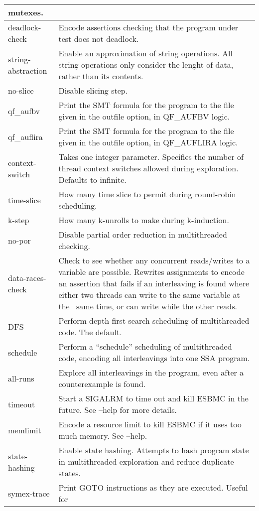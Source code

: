 \documentclass{article}
\begin{document}
\begin{table*}[ht]
\begin{tabularx}{\linewidth}{|l|X|}
mutexes.\\
\hline
deadlock-check & Encode assertions checking that the program under test does not
deadlock.\\
\hline
string-abstraction & Enable an approximation of string operations. All string
operations only consider the lenght of data, rather than its contents.\\
\hline
no-slice & Disable slicing step.\\
\hline
qf\_aufbv & Print the SMT formula for the program to the file given in the
outfile option, in QF\_AUFBV logic.\\
\hline
qf\_auflira & Print the SMT formula for the program to the file given in the
outfile option, in QF\_AUFLIRA logic.\\
\hline
context-switch & Takes one integer parameter. Specifies the number of thread
context switches allowed during exploration. Defaults to infinite.\\
\hline
time-slice & How many time slice to permit during round-robin scheduling.\\
\hline
k-step & How many k-unrolls to make during k-induction.\\
\hline
no-por & Disable partial order reduction in multithreaded checking.\\
\hline
data-races-check & Check to see whether any concurrent reads/writes to a
variable are possible. Rewrites assignments to encode an assertion that fails
if an interleaving is found where either two threads can write to the same
variable at the ~same time, or can write while the other reads.\\
\hline
DFS & Perform depth first search scheduling of multithreaded code. The
default.\\
\hline
schedule & Perform a ``schedule'' scheduling of multithreaded code, encoding
all interleavings into one SSA program.\\
\hline
all-runs & Explore all interleavings in the program, even after a counterexample
is found.\\
\hline
timeout & Start a SIGALRM to time out and kill ESBMC in the future. See --help
for more details.\\
\hline
memlimit & Encode a resource limit to kill ESBMC if it uses too much memory.
See --help.\\
\hline
state-hashing & Enable state hashing. Attempts to hash program state in
multithreaded exploration and reduce duplicate states.\\
\hline
symex-trace & Print GOTO instructions as they are executed. Useful for

\end{tabularx}
\end{table*}
\end{document}
